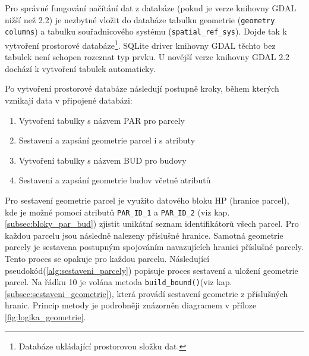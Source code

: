 Pro správné fungování načítání dat z databáze (pokud je verze knihovny
GDAL nižší než 2.2) je nezbytné vložit do databáze tabulku geometrie
(\verb|geometry columns|) a tabulku souřadnicového systému
(\verb|spatial_ref_sys|). Dojde tak k vytvoření prostorové
databáze\footnote{Databáze ukládající prostorovou složku dat.}. SQLite
driver knihovny GDAL těchto bez tabulek není schopen rozeznat typ prvku. U novější
verze knihovny GDAL 2.2 dochází k vytvoření tabulek automaticky.


Po vytvoření prostorové databáze následují postupně kroky, během
kterých vznikají data v připojené databázi:
\begin{enumerate}[leftmargin=50pt]
\item Vytvoření tabulky s názvem PAR pro parcely
\item Sestavení a zapsání geometrie parcel i s atributy
\item Vytvoření tabulky s názvem BUD pro budovy
\item Sestavení a zapsání geometrie budov včetně atributů
\end{enumerate}

Pro sestavení geometrie parcel je využito datového bloku HP (hranice
parcel), kde je možné pomocí atributů \verb|PAR_ID_1| a
\verb|PAR_ID_2| (viz kap. \ref{subsec:bloky_par_bud}) zjistit unikátní seznam
identifikátorů všech parcel. Pro každou parcelu jsou následně nalezeny
příslušné hranice. Samotná geometrie parcely je sestavena 
postupným spojováním navazujících hranici příslušné parcely. Tento proces se opakuje pro každou parcelu. Následující pseudokód(\ref{alg:sestaveni_parcely}) popisuje
proces sestavení a uložení geometrie parcel. Na řádku 10 je volána
metoda \verb|build_bound()|(viz kap. \ref{subsec:sestaveni_geometrie}), která
provádí sestavení geometrie z příslušných hranic. Princip metody je
podrobněji znázorněn diagramem v příloze \ref{fig:logika_geometrie}.

